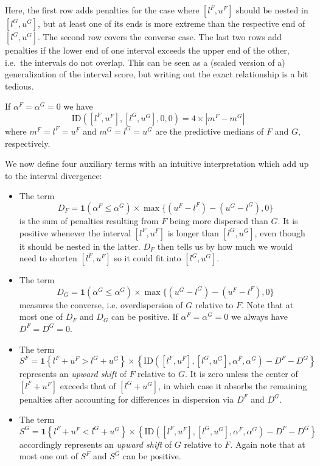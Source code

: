 \documentclass[
]{article}
\begin{document}
Here, the first row adds penalties for the case where \([l^F, u^F]\)
should be nested in \([l^G, u^G]\), but at least one of its ends is more
extreme than the respective end of \([l^G, u^G]\). The second row covers
the converse case. The last two rows add penalties if the lower end of
one interval exceeds the upper end of the other, i.e.~the intervals do
not overlap. This can be seen as a (scaled version of a) generalization
of the interval score, but writing out the exact relationship is a bit
tedious.

If \(\alpha^F = \alpha^G = 0\) we have \[
\text{ID}([l^F, u^F], [l^G, u^G], 0, 0) = 4 \times |m^F - m^G|
\] where \(m^F = l^F = u^F\) and \(m^G = l^G = u^G\) are the predictive
medians of \(F\) and \(G\), respectively.

We now define four auxiliary terms with an intuitive interpretation
which add up to the interval divergence:

\begin{itemize}
\item The term
$$
D_F = \mathbf{1}(\alpha^F \leq \alpha^G)\times\max\{(u^F - l^F) - (u^G - l^G), 0\}
$$
is the sum of penalties resulting from $F$ being more dispersed than $G$. It is positive whenever the interval $[l^F, u^F]$ is longer than $[l^G, u^G]$, even though it should be nested in the latter. $D_F$ then tells us by how much we would need to shorten $[l^F, u^F]$ so it could fit into $[l^G, u^G]$.
\item The term
$$
D_G = \mathbf{1}(\alpha^G \leq \alpha^G)\times\max\{(u^G - l^G) - (u^F - l^F), 0\}
$$
measures the converse, i.e. overdispersion of $G$ relative to $F$. Note that at most one of $D_F$ and $D_G$ can be positive. If $\alpha^F = \alpha^G = 0$ we always have $D^F = D^G = 0$.
\item The term
$$
S^F = \mathbf{1}\left\{l^F + u^F > l^G + u^G \right\} \times \left\{\text{ID}([l^F, u^F], [l^G, u^G], \alpha^F, \alpha^G) - D^F - D^G\right\}
$$
represents an \textit{upward shift} of $F$ relative to $G$. It is zero unless the center of $[l^F + u^F]$ exceeds that of $[l^G + u^G]$, in which case it absorbs the remaining penalties after accounting for differences in dispersion via $D^F$ and $D^G$.
\item The term
$$
S^G = \mathbf{1}\left\{l^F + u^F < l^G + u^G\right\} \times \left\{\text{ID}([l^F, u^F], [l^G, u^G], \alpha^F, \alpha^G) - D^F - D^G\right\}
$$
accordingly represents an \textit{upward shift} of $G$ relative to $F$. Again note that at most one out of $S^F$ and $S^G$ can be positive.
\end{itemize}
\end{document}
